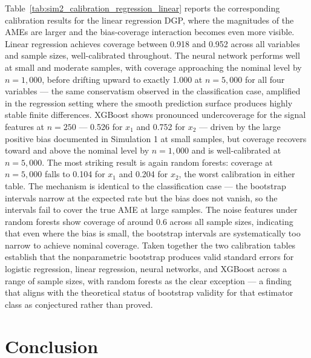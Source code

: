 \documentclass[12pt]{article}
\begin{document}
	Table~\ref{tab:sim2_calibration_regression_linear} reports the corresponding calibration results for the linear regression DGP, where the magnitudes of the AMEs are larger and the bias-coverage interaction becomes even more visible. Linear regression achieves coverage between 0.918 and 0.952 across all variables and sample sizes, well-calibrated throughout. The neural network performs well at small and moderate samples, with coverage approaching the nominal level by $n=1{,}000$, before drifting upward to exactly 1.000 at $n=5{,}000$ for all four variables --- the same conservatism observed in the classification case, amplified in the regression setting where the smooth prediction surface produces highly stable finite differences. XGBoost shows pronounced undercoverage for the signal features at $n=250$ --- 0.526 for $x_1$ and 0.752 for $x_2$ --- driven by the large positive bias documented in Simulation 1 at small samples, but coverage recovers toward and above the nominal level by $n=1{,}000$ and is well-calibrated at $n=5{,}000$. The most striking result is again random forests: coverage at $n=5{,}000$ falls to 0.104 for $x_1$ and 0.204 for $x_2$, the worst calibration in either table. The mechanism is identical to the classification case --- the bootstrap intervals narrow at the expected rate but the bias does not vanish, so the intervals fail to cover the true AME at large samples. The noise features under random forests show coverage of around 0.6 across all sample sizes, indicating that even where the bias is small, the bootstrap intervals are systematically too narrow to achieve nominal coverage. Taken together the two calibration tables establish that the nonparametric bootstrap produces valid standard errors for logistic regression, linear regression, neural networks, and XGBoost across a range of sample sizes, with random forests as the clear exception --- a finding that aligns with the theoretical status of bootstrap validity for that estimator class as conjectured rather than proved.
	
	\section{Conclusion}
	
\end{document}
